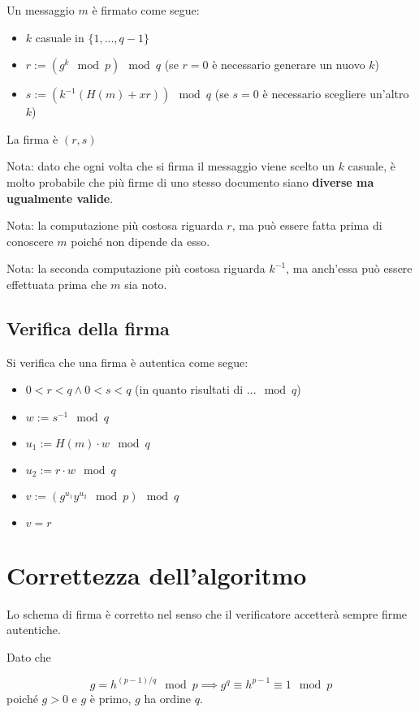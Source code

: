 \documentclass[14pt]{extarticle}
\begin{document}
    Un messaggio $m$ è firmato come segue:
    \begin{itemize}
        \item $k$ casuale in $\{1, ..., q-1\}$
        \item $r := (g^k \mod p) \mod q$ (se $r = 0$ è necessario generare un nuovo $k$)
        \item $s := (k^{-1}(H(m) + xr)) \mod q$ (se $s = 0$ è necessario scegliere un'altro $k$)
    \end{itemize}
    La firma è $(r, s)$

    \bigskip
    Nota: dato che ogni volta che si firma il messaggio viene scelto un $k$ casuale, è molto probabile che più firme di uno stesso documento siano \textbf{diverse ma ugualmente valide}.

    \bigskip
    Nota: la computazione più costosa riguarda $r$, ma può essere fatta prima di conoscere $m$ poiché non dipende da esso.

    \bigskip
    Nota: la seconda computazione più costosa riguarda $k^{-1}$, ma anch'essa può essere effettuata prima che $m$ sia noto.

    \subsection{Verifica della firma}

    Si verifica che una firma è autentica come segue:
    \begin{itemize}
        \item $0 < r < q \wedge 0 < s < q$ (in quanto risultati di $... \mod q$)
        \item $w := s^{-1} \mod q$
        \item $u_1 := H(m) \cdot w \mod q$
        \item $u_2 := r \cdot w \mod q$
        \item $v := (g^{u_1}y^{u_2} \mod p) \mod q$
        \item $v = r$
    \end{itemize}

    \section{Correttezza dell'algoritmo}

    Lo schema di firma è corretto nel senso che il verificatore accetterà sempre firme autentiche.

    \bigskip
    Dato che
    
    \begin{equation*}
        g = h^{(p-1)/q} \mod p
        \implies
        g^q \equiv h^{p-1} \equiv 1 \mod p
    \end{equation*}
    poiché $g > 0$ e $g$ è primo, $g$ ha ordine $q$.
\end{document}
